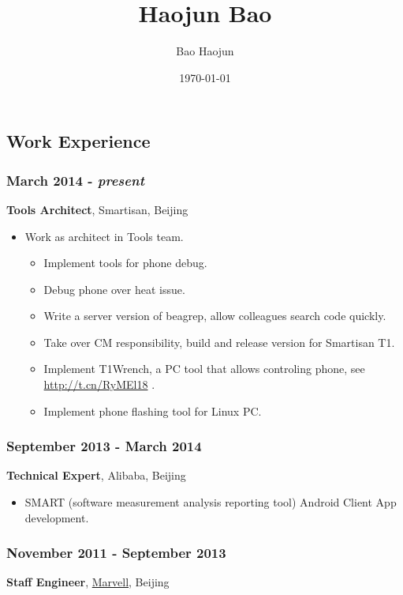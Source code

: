 \documentclass[11pt,dvipdfmx,CJKbookmarks]{article}
\author{Bao Haojun}
\date{\today}
\title{Haojun Bao}
\begin{document}
\begin{CJK*}{UTF8}{simsun}

\maketitle
{}



\section{Work Experience}
\label{sec-1}
\subsubsection{March 2014 - \emph{present}}
\label{sec-1-0-1}
\textbf{Tools Architect}, Smartisan, Beijing

\begin{itemize}
\item Work as architect in Tools team.
\begin{itemize}
\item Implement tools for phone debug.
\item Debug phone over heat issue.
\item Write a server version of beagrep, allow colleagues search code quickly.
\item Take over CM responsibility, build and release version for Smartisan T1.
\item Implement T1Wrench, a PC tool that allows controling phone, see \url{http://t.cn/RyMEl18} .
\item Implement phone flashing tool for Linux PC.
\end{itemize}
\end{itemize}

\subsubsection{September 2013 - March 2014}
\label{sec-1-0-2}
\textbf{Technical Expert}, Alibaba, Beijing
\begin{itemize}
\item SMART (software measurement analysis reporting tool) Android
Client App development.
\end{itemize}

\subsubsection{November 2011 - September 2013}
\label{sec-1-0-3}
\textbf{Staff Engineer}, \href{http://marvell.com}{Marvell}, Beijing


\end{CJK*}
\end{document}
